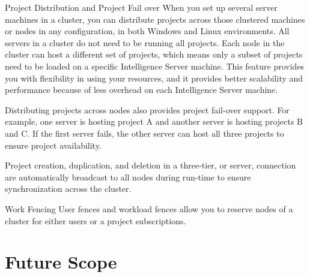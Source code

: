 \documentclass[12pt]{article}
\begin{document}
Project Distribution and Project Fail over
When you set up several server machines in a cluster, you can distribute projects across those clustered machines or nodes in any configuration, in both Windows and Linux environments. All servers in a cluster do not need to be running all projects. Each node in the cluster can host a different set of projects, which means only a subset of projects need to be loaded on a specific Intelligence Server machine. This feature provides you with flexibility in using your resources, and it provides better scalability and performance because of less overhead on each Intelligence Server machine.

Distributing projects across nodes also provides project fail-over support. For example, one server is hosting project A and another server is hosting projects B and C. If the first server fails, the other server can host all three projects to ensure project availability.

Project creation, duplication, and deletion in a three-tier, or server, connection are automatically broadcast to all nodes during run-time to ensure synchronization across the cluster.

Work Fencing
User fences and workload fences allow you to reserve nodes of a cluster for either users or a project subscriptions. 

\newpage
\section{Future Scope}

\newpage
\end{document}
